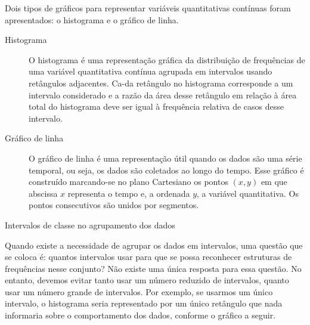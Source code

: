 {{\begin{figure}[H]
\end{figure}
\newpage

\arrange{ }
\label{est1-org-2}
Dois tipos de gráficos para representar variáveis quantitativas contínuas foram apresentados: o histograma e o gráfico de linha.
\begin{description}
\item[{Histograma}] \leavevmode{}\label{est1-def-14}
O histograma é uma representação gráfica da distribuição de frequências de uma variável quantitativa contínua agrupada em intervalos usando retângulos adjacentes. Ca-da retângulo no histograma corresponde a um intervalo considerado e a razão da área desse retângulo em relação à área total do histograma deve ser igual à frequência relativa de casos desse intervalo.

\end{description}
\begin{description}
\item[{Gráfico de linha}] \leavevmode{}\label{est1-def-15}
O gráfico de linha é uma representação útil quando os dados são uma série temporal, ou seja, os dados são coletados ao longo do tempo. Esse gráfico é construído marcando-se no plano Cartesiano os pontos \((x,y)\) em que abscissa \(x\) representa o tempo e, a ordenada \(y\), a variável quantitativa. Os pontos consecutivos são unidos por segmentos.

\end{description}

\begin{example}{Intervalos de classe no agrupamento dos dados}

Quando existe a necessidade de agrupar os dados em intervalos, uma questão que se coloca é: quantos intervalos usar para que se possa reconhecer estruturas de frequências nesse conjunto? Não existe uma única resposta para essa questão. No entanto, devemos evitar tanto usar um número reduzido de intervalos, quanto usar um número grande de intervalos. Por exemplo, se usarmos um único intervalo, o histograma seria representado por um único retângulo que nada informaria sobre o comportamento dos dados, conforme o gráfico a seguir.

\begin{figure}[H]
\centering
\capstart

\noindent
{}
\end{figure}
\end{example}}}
